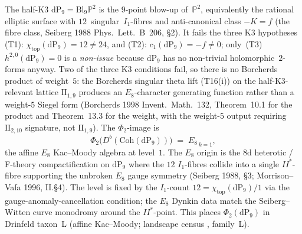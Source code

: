 \begin{remark}[Half-K3 \texorpdfstring{$= \mathrm{dP}_9$}{= dP-9} maps to~\texorpdfstring{$\widehat{E_8}_1$}{widehatE-8-1};
no \texorpdfstring{$\mathbf{H}_{\Delta_5}$}{H-Delta-5}-analogue, strikes taxon~L]
\label{rem:dcy-halfk3}
The half-K3 $\mathrm{dP}_9 = \mathrm{Bl}_9\mathbb{P}^2$ is the
$9$-point blow-up of~$\mathbb{P}^2$, equivalently the rational
elliptic surface with $12$~singular~$I_1$-fibres and anti-canonical
class $-K = f$ (the fibre class, Seiberg 1988
\textup{Phys.~Lett.~B}~206, \S2). It fails the three K3 hypotheses
(T1): $\chi_{\mathrm{top}}(\mathrm{dP}_9) = 12\ne 24$, and
(T2): $c_1(\mathrm{dP}_9) = -f \ne 0$; only~(T3)
$h^{2,0}(\mathrm{dP}_9) = 0$ is a \emph{non-issue} because
$\mathrm{dP}_9$ has no non-trivial holomorphic~$2$-forms anyway.
Two of the three K3 conditions fail, so there is no Borcherds
product of weight~$5$: the Borcherds singular theta lift (T16(i))
on the half-K3-relevant lattice $\mathrm{II}_{1,9}$ produces an
$E_8$-character generating function rather than a weight-$5$
Siegel form (Borcherds 1998 \textup{Invent.~Math.}~132,
Theorem~10.1 for the product and Theorem~13.3 for the weight, with the weight-$5$ output requiring
$\mathrm{II}_{2,10}$ signature, not $\mathrm{II}_{1,9}$). The
$\Phi_2$-image is
\[
 \Phi_2\bigl(D^b(\mathrm{Coh}(\mathrm{dP}_9))\bigr)
 \;=\;
 \widehat{E_8}_{\,k=1},
\]
the affine $E_8$ Kac--Moody algebra at level~$1$. The $E_8$
origin is the $8$d heterotic / F-theory compactification on
$\mathrm{dP}_9$ where the $12$ $I_1$-fibres collide into a single
$II^*$-fibre supporting the unbroken $E_8$ gauge symmetry
(Seiberg 1988, \S3; Morrison--Vafa 1996, II.\S4). The level is
fixed by the $I_1$-count $12 = \chi_{\mathrm{top}}(\mathrm{dP}_9)
/ 1$ via the gauge-anomaly-cancellation condition; the $E_8$
Dynkin data match the Seiberg--Witten curve monodromy around
the $II^*$-point. This places $\Phi_2(\mathrm{dP}_9)$ in Drinfeld
taxon~L (affine Kac--Moody; landscape census
\cite{VolI}, family~L).
\end{remark}


